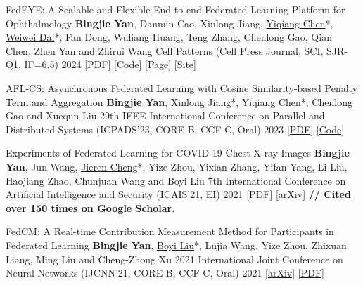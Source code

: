 \begin{cvpublications}
\cvpublication
{FedEYE: A Scalable and Flexible End-to-end Federated Learning Platform for Ophthalmology} %
{\textbf{Bingjie Yan}, Danmin Cao, Xinlong Jiang, \underline{Yiqiang Chen}*, \underline{Weiwei Dai}*, Fan Dong, Wuliang Huang, Teng Zhang, Chenlong Gao, Qian Chen, Zhen Yan and Zhirui Wang} %
{Cell Patterns (Cell Press Journal, SCI, SJR-Q1, IF=6.5)} %
{2024} %
{\href{https://www.cell.com/patterns/fulltext/S2666-3899(24)00019-9}{[PDF]} \href{https://github.com/beiyuouo/FedEYE}{[Code]} \href{https://www.bj-yan.top/FedEYE/}{[Page]} \href{https://fedeye.aierchina.com/}{[Site]}} %


\cvpublication
{AFL-CS: Asynchronous Federated Learning with Cosine Similarity-based Penalty Term and Aggregation} %
{\textbf{Bingjie Yan}, \underline{Xinlong Jiang}*, \underline{Yiqiang Chen}*, Chenlong Gao and Xuequn Liu} %
{29th IEEE International Conference on Parallel and Distributed Systems (ICPADS'23, CORE-B, CCF-C, \textcolor{awesome}{Oral})} %
{2023} %
{\href{https://ieeexplore.ieee.org/document/10476054}{[PDF]} \href{https://github.com/beiyuouo/AFL-CS-ICPADS}{[Code]}} %


\cvpublication
{Experiments of Federated Learning for COVID-19 Chest X-ray Images} %
{\textbf{Bingjie Yan}, Jun Wang, \underline{Jieren Cheng}*, Yize Zhou, Yixian Zhang, Yifan Yang, Li Liu, Haojiang Zhao, Chunjuan Wang and Boyi Liu} %
{7th International Conference on Artificial Intelligence and Security (ICAIS'21, EI)} %
{2021} %
{
	\href{https://link.springer.com/chapter/10.1007/978-3-030-78618-2_4}{[PDF]} \href{https://arxiv.org/abs/2007.05592}{[arXiv]}
	\newline \textbf{// Cited over 150 times on Google Scholar.} 
} %


\cvpublication
{FedCM: A Real-time Contribution Measurement Method for Participants in Federated Learning} %
{\textbf{Bingjie Yan}, \underline{Boyi Liu}*, Lujia Wang, Yize Zhou, Zhixuan Liang, Ming Liu and Cheng-Zhong Xu} %
{2021 International Joint Conference on Neural Networks (IJCNN'21, CORE-B, CCF-C, \textcolor{awesome}{Oral})} %
{2021} %
{\href{https://arxiv.org/abs/2009.03510}{[arXiv]} \href{https://ieeexplore.ieee.org/abstract/document/9534451/}{[PDF]}} %


\end{cvpublications}
